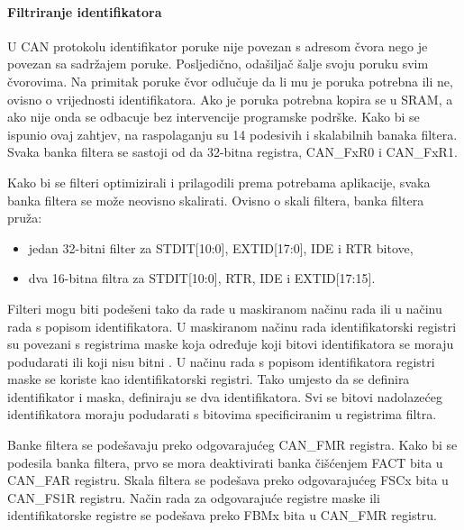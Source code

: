 \paragraph{Filtriranje identifikatora}

U CAN protokolu identifikator poruke nije povezan s adresom čvora nego je povezan sa sadržajem poruke. Posljedično, odašiljač šalje svoju poruku svim čvorovima. Na primitak poruke čvor odlučuje da li mu je poruka potrebna ili ne, ovisno o vrijednosti identifikatora. Ako je poruka potrebna kopira se u SRAM, a ako nije onda se odbacuje bez intervencije programske podrške. Kako bi se ispunio ovaj zahtjev, na raspolaganju su 14 podesivih i skalabilnih banaka filtera. Svaka banka filtera se sastoji od da 32-bitna registra, CAN\_FxR0 i CAN\_FxR1.

Kako bi se filteri optimizirali i prilagodili prema potrebama aplikacije, svaka banka filtera se može neovisno skalirati. Ovisno o skali filtera, banka filtera pruža:
\begin{itemize}
	\item jedan 32-bitni filter za STDIT[10:0], EXTID[17:0], IDE i RTR bitove,
	\item dva 16-bitna filtra za STDIT[10:0], RTR, IDE i EXTID[17:15].
\end{itemize}
\noindent Filteri mogu biti podešeni tako da rade u maskiranom načinu rada ili u načinu rada s popisom identifikatora. U maskiranom načinu rada identifikatorski registri su povezani s registrima maske koja određuje koji bitovi identifikatora se moraju podudarati  ili koji nisu bitni . U načinu rada s popisom identifikatora registri maske se koriste kao identifikatorski registri. Tako umjesto da se definira identifikator i maska, definiraju se dva identifikatora. Svi se bitovi nadolazećeg identifikatora moraju podudarati s bitovima specificiranim u registrima filtra.

Banke filtera se podešavaju preko odgovarajućeg CAN\_FMR registra. Kako bi se podesila banka filtera, prvo se mora deaktivirati banka čišćenjem FACT bita u CAN\_FAR registru. Skala filtera se podešava preko odgovarajućeg FSCx bita u CAN\_FS1R registru. Način rada za odgovarajuće registre maske ili identifikatorske registre se podešava preko FBMx bita u CAN\_FMR registru.


